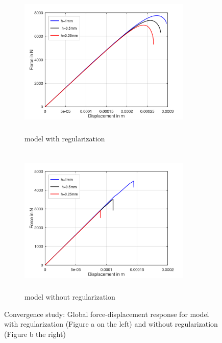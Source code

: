 \documentclass[12pt]{report}
\begin{document}
\begin{figure}[htbp!]
     \captionsetup[subfigure]{justification=centering}
     \begin{subfigure}{0.4\textwidth}
         \includegraphics[width=8.2cm,height=7.2cm,keepaspectratio]{25.FvsD.png}
         \caption{model with regularization}
         \label{fig:with regularization}
     \end{subfigure}
     \hspace{1.8cm}
     \begin{subfigure}{0.4\textwidth}
         \includegraphics[width=8.2cm,height=7.2cm,keepaspectratio]{25.FvsD2.png}
         \caption{model without regularization}
         \label{fig:without regularization}
     \end{subfigure}
    \caption{Convergence study: Global force-displacement response for model with regularization (Figure a on the left) and without regularization (Figure b the right) }
    \label{fig:Convergence study}
\end{figure}
\FloatBarrier
 
\end{document}
